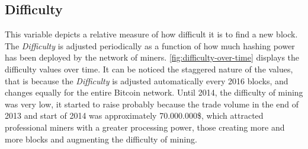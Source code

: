 


\subsection{Difficulty}
\label{sec:difficulty}


This variable depicts a relative measure of how difficult it is to
find a new block. The \textit{Difficulty} is adjusted periodically as
a function of how much hashing power has been deployed by the network
of miners. \autoref{fig:difficulty-over-time} displays the difficulty
values over time. It can be noticed the staggered nature of the
values, that is because the \textit{Difficulty} is adjusted
automatically every 2016 blocks, and changes equally for the entire
Bitcoin network. Until 2014, the difficulty of mining was very low, it
started to raise probably because the trade volume in the end of 2013
and start of 2014 was approximately 70.000.000\$, which attracted
professional miners with a greater processing power, those creating
more and more blocks and augmenting the difficulty of mining.

